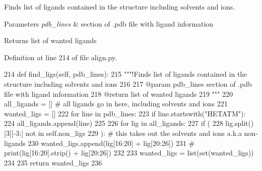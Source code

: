 Finds list of ligands contained in the structure including solvents and ions. 


\begin{DoxyParams}{Parameters}
{\em pdb\+\_\+lines} & section of .pdb file with ligand information \\
\hline
\end{DoxyParams}
\begin{DoxyReturn}{Returns}
list of wanted ligands 
\end{DoxyReturn}


Definition at line 214 of file align.\+py.


\begin{DoxyCode}
214     \textcolor{keyword}{def }find\_ligs(self, pdb\_lines):
215         \textcolor{stringliteral}{"""!Finds list of ligands contained in the structure including solvents and ions}
216 \textcolor{stringliteral}{}
217 \textcolor{stringliteral}{        @param pdb\_lines section of .pdb file with ligand information }
218 \textcolor{stringliteral}{        @return list of wanted ligands}
219 \textcolor{stringliteral}{        """}
220         all\_ligands = []  \textcolor{comment}{# all ligands go in here, including solvents and ions}
221         wanted\_ligs = []
222         \textcolor{keywordflow}{for} line \textcolor{keywordflow}{in} pdb\_lines:
223             \textcolor{keywordflow}{if} line.startswith(\textcolor{stringliteral}{"HETATM"}):
224                 all\_ligands.append(line)
225 
226         \textcolor{keywordflow}{for} lig \textcolor{keywordflow}{in} all\_ligands:
227             \textcolor{keywordflow}{if} (
228                     lig.split()[3][-3:] \textcolor{keywordflow}{not} \textcolor{keywordflow}{in} self.non\_ligs
229             ):  \textcolor{comment}{# this takes out the solvents and ions a.k.a non-ligands}
230                 wanted\_ligs.append(lig[16:20] + lig[20:26])
231                 \textcolor{comment}{# print(lig[16:20].strip() + lig[20:26])}
232 
233         wanted\_ligs = list(set(wanted\_ligs))
234 
235         \textcolor{keywordflow}{return} wanted\_ligs
236 
\end{DoxyCode}
\mbox{\label{classfragalysis__api_1_1xcimporter_1_1align_1_1_monomerize_ae400c1aa47fa3a5fe32a3ade3f601582}} 
